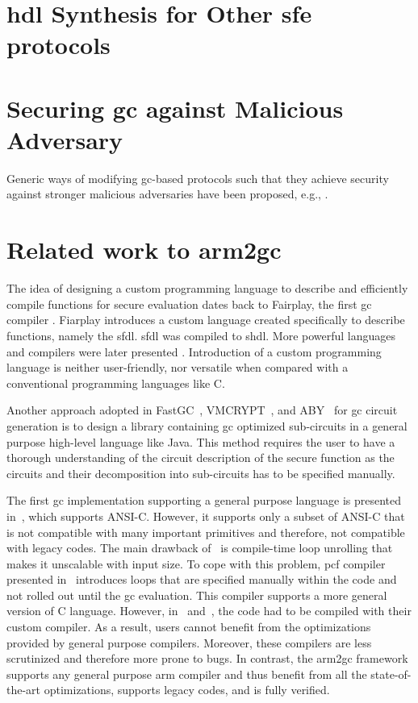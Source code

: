 \section{\acrshort{hdl} Synthesis for Other \acrshort{sfe} protocols}

\section{Securing \acrshort{gc} against Malicious Adversary}
Generic ways of modifying \acrshort{gc}-based protocols such that they achieve security against stronger malicious adversaries have been proposed, e.g., \cite{lindell2007efficient, lindell2012secure, nielsen2009lego}.

\section{Related work to \gls{arm2gc}}
The idea of designing a custom programming language to describe and efficiently compile functions for secure evaluation dates back to Fairplay, the first \acrshort{gc} compiler \cite{malkhi2004fairplay}.
Fiarplay introduces a custom language created specifically to describe functions, namely the \acrfull{sfdl}.
\acrshort{sfdl} was compiled to \acrfull{shdl}.
More powerful languages and compilers were later presented \cite{henecka2010tasty, kreuter2012billion, rastogi2014wysteria}.
Introduction of a custom programming language is neither user-friendly, nor versatile when compared with a conventional programming languages like C.

Another approach adopted in FastGC~\cite{huang2011faster, henecka2013faster}, VMCRYPT~\cite{malka2011vmcrypt}, and ABY~\cite{demmler2015aby} for \acrshort{gc} circuit generation is to design a library containing \acrshort{gc} optimized sub-circuits in a general purpose high-level language like Java.
This method requires the user to have a thorough understanding of the circuit description of the secure function as the circuits and their decomposition into sub-circuits has to be specified manually.

The first \acrshort{gc} implementation supporting a general purpose language is presented in~\cite{holzer2012secure}, which supports ANSI-C.
However, it supports only a subset of ANSI-C that is not compatible with many important primitives and therefore, not compatible with legacy codes.
The main drawback of~\cite{holzer2012secure} is compile-time loop unrolling that makes it unscalable with input size.
To cope with this problem, \gls{pcf} compiler presented in~\cite{kreuter2013pcf} introduces loops that are specified manually within the code and not rolled out until the \acrshort{gc} evaluation.
This compiler supports a more general version of C language.
However, in~\cite{holzer2012secure} and~\cite{kreuter2013pcf}, the code had to be compiled with their custom compiler.
As a result, users cannot benefit from the optimizations provided by general purpose compilers.
Moreover, these compilers are less scrutinized and therefore more prone to bugs.
In contrast, the \gls{arm2gc} framework supports any general purpose \gls{arm} compiler and thus benefit from all the state-of-the-art optimizations, supports legacy codes, and is fully verified.

